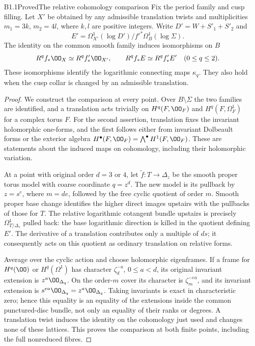 \begin{claim}{B1.1}{Proved}{The relative cohomology comparison}
Fix the period family and cusp filling. Let $X'$ be obtained by any
admissible translation twists and multiplicities $m_1=3k$, $m_2=4l$,
where $k,l$ are positive integers. Write $D'=W+S'_1+S'_2$ and
\[
E'=\Omega^1_{X'}(\log D')/f'^*\Omega^1_B(\log\Sigma).
\]
The identity on the common smooth family induces isomorphisms on $B$
\[
R^qf_*\OO_X\simeq R^qf'_*\OO_{X'},\qquad
R^qf_*E\simeq R^qf'_*E'\quad(0\le q\le2).
\]
These isomorphisms identify the logarithmic connecting maps $\kappa_q$.
They also hold when the cusp collar is changed by an admissible translation.
\end{claim}
\begin{proof}
We construct the comparison at every point. Over $B\setminus\Sigma$
the two families are identified, and a translation acts trivially on
$H^q(F,\OO_F)$ and $H^q(F,\Omega^1_F)$ for a complex torus $F$.
For the second assertion, translation fixes the invariant holomorphic
one-forms, and the first follows either from invariant Dolbeault forms
or the exterior algebra $H^\bullet(F,\OO_F)=\bigwedge^\bullet H^1(F,\OO_F)$.
These are statements about the induced maps on cohomology, including
their holomorphic variation.

At a point with original order $d=3$ or $4$, let
$\widetilde f:T\to\Delta_z$ be the smooth proper torus model with
coarse coordinate $q=z^d$. The new model is its pullback by $z=s^e$,
where $m=de$, followed by the free cyclic quotient of order $m$.
Smooth proper base change identifies the higher direct images upstairs
with the pullbacks of those for $T$. The relative logarithmic cotangent
bundle upstairs is precisely $\Omega^1_{T/\Delta_z}$ pulled back:
the base logarithmic direction is killed in the quotient defining $E'$.
The derivative of a translation contributes only a multiple of $ds$;
it consequently acts on this quotient as ordinary translation on relative forms.

Average over the cyclic action and choose holomorphic eigenframes.
If a frame for $H^q(\OO)$ or $H^q(\Omega^1)$ has character
$\zeta_d^{-a}$, $0\le a<d$, its original invariant extension is
$z^a\OO_{\Delta_q}$. On the order-$m$ cover its character is
$\zeta_m^{-ea}$, and its invariant extension is
$s^{ea}\OO_{\Delta_q}=z^a\OO_{\Delta_q}$.
Taking invariants is exact in characteristic zero; hence this equality
is an equality of the extensions inside the common punctured-disc
bundle, not only an equality of their ranks or degrees. A translation
twist induces the identity on the cohomology just used and changes none
of these lattices. This proves the comparison at both finite points,
including the full nonreduced fibres.


\end{proof}
